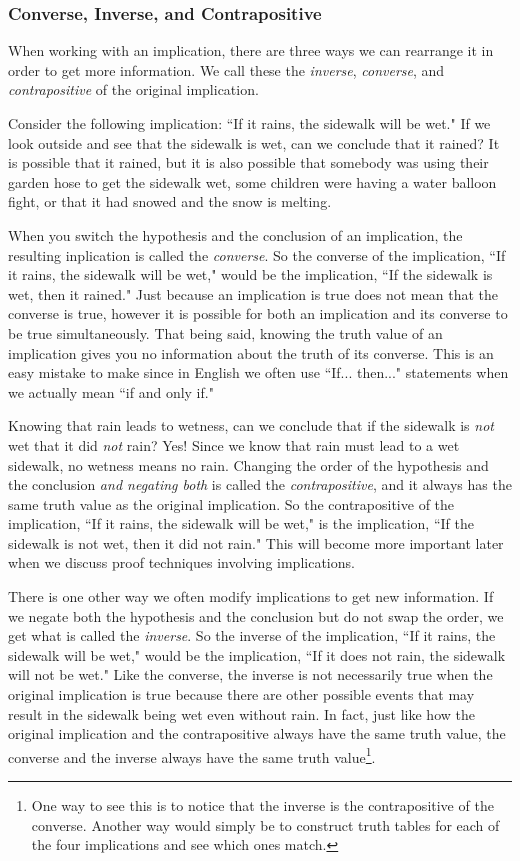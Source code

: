 \documentclass[11pt,oneside]{book}
\theoremstyle{definition}
\begin{document}
\subsubsection{Converse, Inverse, and Contrapositive}
When working with an implication, there are three ways we can rearrange it in order to get more information.
We call these the \emph{inverse}, \emph{converse}, and \emph{contrapositive} of the original implication.

Consider the following implication:  ``If it rains, the sidewalk will be wet."
If we look outside and see that the sidewalk is wet, can we conclude that it rained?
It is possible that it rained, but it is also possible that somebody was using their garden hose to get the sidewalk wet, some children were having a water balloon fight, or that it had snowed and the snow is melting.

When you switch the hypothesis and the conclusion of an implication, the resulting inplication is called the \emph{converse}.
So the converse of the implication, ``If it rains, the sidewalk will be wet," would be the implication, ``If the sidewalk is wet, then it rained."
Just because an implication is true does not mean that the converse is true, however it is possible for both an implication and its converse to be true simultaneously.
That being said, knowing the truth value of an implication gives you no information about the truth of its converse.
This is an easy mistake to make since in English we often use ``If... then..." statements when we actually mean ``if and only if."

Knowing that rain leads to wetness, can we conclude that if the sidewalk is \emph{not} wet that it did \emph{not} rain?
Yes!
Since we know that rain must lead to a wet sidewalk, no wetness means no rain.
Changing the order of the hypothesis and the conclusion \emph{and negating both} is called the \emph{contrapositive}, and it always has the same truth value as the original implication.
So the contrapositive of the implication, ``If it rains, the sidewalk will be wet," is the implication, ``If the sidewalk is not wet, then it did not rain."
This will become more important later when we discuss proof techniques involving implications.

There is one other way we often modify implications to get new information.
If we negate both the hypothesis and the conclusion but do not swap the order, we get what is called the \emph{inverse}.
So the inverse of the implication, ``If it rains, the sidewalk will be wet," would be the implication, ``If it does not rain, the sidewalk will not be wet."
Like the converse, the inverse is not necessarily true when the original implication is true because there are other possible events that may result in the sidewalk being wet even without rain.
In fact, just like how the original implication and the contrapositive always have the same truth value, the converse and the inverse always have the same truth value\footnote{
    One way to see this is to notice that the inverse is the contrapositive of the converse.
    Another way would simply be to construct truth tables for each of the four implications and see which ones match.
}.
\end{document}
